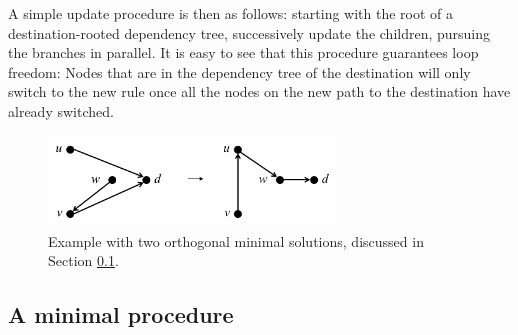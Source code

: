 A simple update procedure is then as follows: starting with the root of a destination-rooted dependency tree, successively update the children, pursuing the branches in parallel. 
It is easy to see that this procedure guarantees loop freedom: Nodes that are in the dependency tree of the destination will only switch to the new rule once all the nodes on the new path to the destination have already switched.








\begin{figure}[t!]
\includegraphics[width=3in]{figures/nominimum.png}
\caption{Example with two orthogonal minimal solutions, discussed in Section \ref{sec:minimal}.}
\label{fig:minimal}
\end{figure}

\subsection{A minimal procedure}
\label{sec:minimal}


